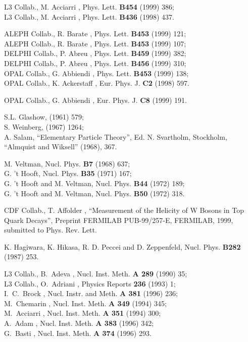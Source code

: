 \documentclass[12pt,a4paper,dvips]{article}
\begin{document}
\begin{mcbibliography}{10}

L3 Collab., M. Acciarri \etal,
Phys. Lett. {\bf B454}  (1999) 386;\\
L3 Collab., M. Acciarri \etal,
Phys. Lett. {\bf B436}  (1998) 437.

ALEPH Collab., R. Barate \etal,
  Phys. Lett. {\bf B453}  (1999) 121;\\
ALEPH Collab., R. Barate \etal,
  Phys. Lett. {\bf B453}  (1999) 107;\\
DELPHI Collab., P. Abreu \etal,
  Phys. Lett. {\bf B459}  (1999) 382;\\
DELPHI Collab., P. Abreu \etal,
  Phys. Lett. {\bf B456}  (1999) 310;\\
OPAL Collab., G. Abbiendi \etal,
  Phys. Lett. {\bf B453}  (1999) 138;\\
OPAL Collab., K. Ackerstaff \etal,
  Eur. Phys. J. {\bf C2}  (1998) 597.

OPAL Collab., G. Abbiendi \etal,
  Eur. Phys. J. {\bf C8}  (1999) 191.

S.L. Glashow,  (1961) 579;\\ S. Weinberg,  (1967)
  1264;\\ A. Salam, ``Elementary Particle Theory'', Ed. N. Svartholm,
  Stockholm, ``Alm\-quist and Wiksell'' (1968), 367.

M. Veltman,
  Nucl. Phys. {\bf B7}  (1968) 637;\\
G. 't Hooft,
  Nucl. Phys. {\bf B35}  (1971) 167;\\
G. 't Hooft and M. Veltman,
  Nucl. Phys. {\bf B44}  (1972) 189;\\
G. 't Hooft and M. Veltman,
  Nucl. Phys. {\bf B50}  (1972) 318.

CDF Collab., T. Affolder \etal,
  ``Measurement of the Helicity of W Bosons in Top Quark Decays'',
  Preprint FERMILAB PUB-99/257-E, FERMILAB, 1999,
  submitted to Phys. Rev. Lett.

K. Hagiwara, K. Hikasa, R. D. Peccei and D. Zeppenfeld,
  Nucl. Phys. {\bf B282}  (1987) 253.

L3 Collab., B.~Adeva \etal,
  Nucl. Inst. Meth. {\bf A 289}  (1990) 35;\\
L3 Collab., O.~Adriani \etal,
  Physics Reports {\bf 236}  (1993) 1;\\
I.~C.~Brock \etal,
  Nucl. Instr. and Meth. {\bf A 381}  (1996) 236;\\
M.~Chemarin \etal,
  Nucl. Inst. Meth. {\bf A 349}  (1994) 345;\\
M.~Acciarri \etal,
  Nucl. Inst. Meth. {\bf A 351}  (1994) 300;\\
A.~Adam \etal,
  Nucl. Inst. Meth. {\bf A 383}  (1996) 342;\\
G.~Basti \etal,
  Nucl. Inst. Meth. {\bf A 374}  (1996) 293.


\end{mcbibliography}
\end{document}
